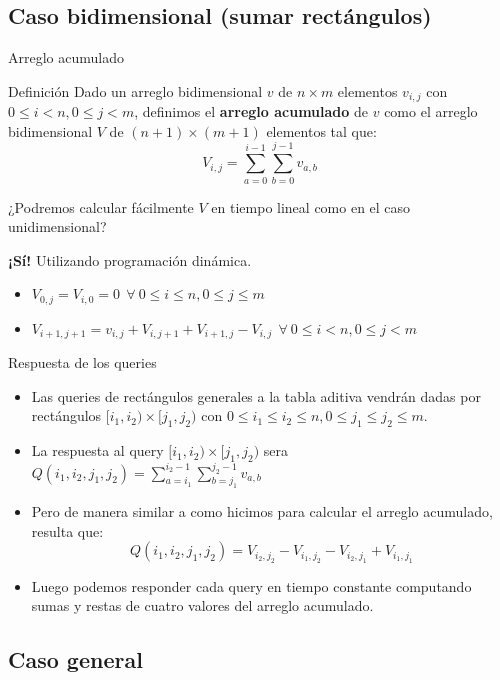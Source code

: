 \documentclass{beamer}
\begin{document}
\subsection{Caso bidimensional (sumar rectángulos)}

\begin{frame}{Arreglo acumulado}
   \begin{block}{Definición}
      Dado un arreglo bidimensional $v$ de $n \times m$ elementos $v_{i,j}$ con $0 \leq i < n, 0\leq j < m$,
      definimos el \textbf{arreglo acumulado} de $v$ como el arreglo bidimensional $V$ de $(n+1) \times (m+1)$ elementos
      tal que:
      $$V_{i,j} = \sum_{a=0}^{i-1}\sum_{b=0}^{j-1}{v_{a,b}}$$
  \end{block}
  ¿Podremos calcular fácilmente $V$ en tiempo lineal como en el caso unidimensional?
  {
      \textbf{¡Sí!} Utilizando programación dinámica.
      \begin{itemize}
        \item $V_{0,j} = V_{i,0} = 0 \ \ \forall \ 0 \leq i \leq n, 0 \leq j \leq m$
        \item $V_{i+1,j+1} = v_{i,j} + V_{i,j+1} + V_{i+1,j} - V_{i,j} \ \ \forall \ 0 \leq i < n, 0 \leq j < m$
      \end{itemize}
  }
\end{frame}

\begin{frame}{Respuesta de los queries}
  \begin{itemize}
  \item Las queries de rectángulos generales a la tabla aditiva vendrán dadas por rectángulos $[i_1,i_2) \times [j_1,j_2)$ con $0 \leq i_1 \leq i_2 \leq n, 0 \leq j_1 \leq j_2 \leq m$.
  \item La respuesta al query $[i_1,i_2) \times [j_1,j_2)$ sera $Q(i_1,i_2,j_1,j_2) = \sum \limits _{a=i_1}^{i_2-1}\sum \limits _{b=j_1}^{j_2-1}{v_{a,b}}$
    \item Pero de manera similar a como hicimos para calcular el arreglo acumulado, resulta que:
    $$Q(i_1,i_2,j_1,j_2) = V_{i_2,j_2} - V_{i_1,j_2} - V_{i_2,j_1} + V_{i_1,j_1}$$
    \item Luego podemos responder cada query en tiempo constante computando sumas y restas de cuatro valores del arreglo acumulado.
  \end{itemize}
\end{frame}

\subsection{Caso general}
\end{document}
